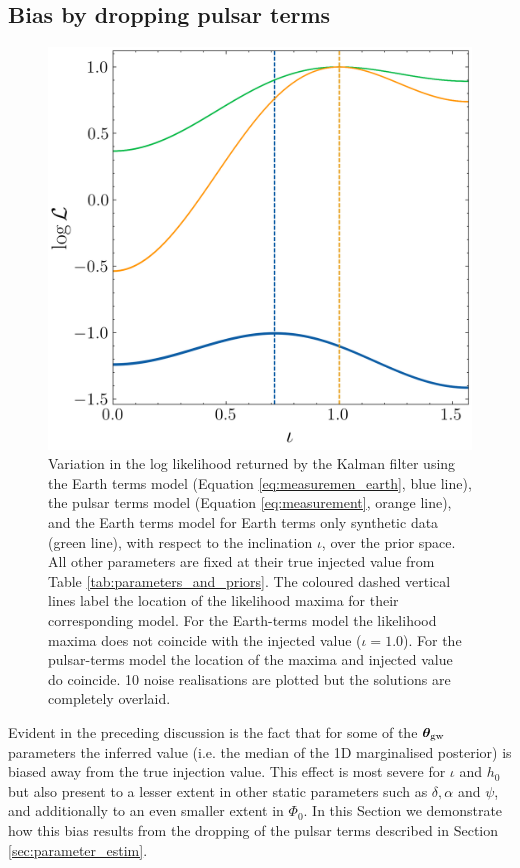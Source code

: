 \documentclass[fleqn,usenatbib,useAMS]{mnras}
\begin{document}
\subsection{Bias by dropping pulsar terms}\label{sec:bias}
\begin{figure}
	\centering
	\includegraphics[width=\columnwidth]{images/likelihood_iota_new}
	\caption{Variation in the log likelihood returned by the Kalman filter using the Earth terms model (Equation \ref{eq:measuremen_earth}, blue line), the pulsar terms model (Equation \ref{eq:measurement}, orange line), and the Earth terms model for Earth terms only synthetic data (green line), with respect to the inclination $\iota$, over the prior space. All other parameters are fixed at their true injected value from Table \ref{tab:parameters_and_priors}. The coloured dashed vertical lines label the location of the likelihood maxima for their corresponding model. For the Earth-terms model the likelihood maxima does not coincide with the injected value ($\iota = 1.0$). For the pulsar-terms model the location of the maxima and injected value do coincide. 10 noise realisations are plotted but the solutions are completely overlaid.}
	\label{fig:likelihood_surface_iota}
\end{figure}
Evident in the preceding discussion is the fact that for some of the $\boldsymbol{\theta}_{\rm gw}$ parameters the inferred value (i.e. the median of the 1D marginalised posterior) is biased away from the true injection value. This effect is most severe for $\iota$ and $h_0$ but also present to a lesser extent in other static parameters such as $\delta,\alpha$ and $\psi$, and additionally to an even smaller extent in $\Phi_0$. In this Section we demonstrate how this bias results from the dropping of the pulsar terms described in Section \ref{sec:parameter_estim}. \newline 
\end{document}
